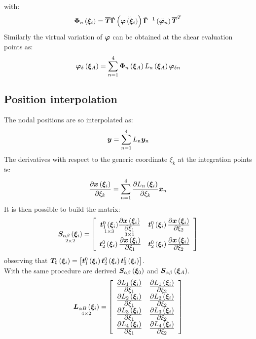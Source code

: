 with:
\begin{equation}
\T{ \Phi }_n \valxii =
\overline{ \TT{T} } \tilde{\TT{\Gamma}} \plbr{ \tilde{ \T{\varphi} \valxii } }  \tilde{\TT{\Gamma}} ^ {-1} \plbr{ \tilde{ \T{\varphi} }_n } \overline{ \TT{T} } ^ T
\end{equation}
Similarly the virtual variation of $\T{\varphi}$ can be obtained at the shear evaluation points as:
\begin{equation}
\T{ \varphi }_{\delta} \valxiA =
\sum_{ n = 1 }^{ 4 } \T{ \Phi }_n \valxiA L_n \valxiA \T{\varphi}_{\delta n}
\end{equation}
\subsection{Position interpolation}
The nodal positions are so interpolated as:
\begin{equation}
\T{ y }   = \sum_{ n = 1 }^4  L_n   \T{ y }_n
\end{equation}
The derivatives with respect to the generic coordinate $\xi_k$ at the integration points is:
\begin{equation}
\fracdp{ \T{ x } \valxii }{ \xi_k }  = \sum_{ n = 1 }^4 \fracdp{ L_n \valxii }{ \xi_k } \T{ x }_n
\end{equation}
It is then possible to build the matrix:
\begin{equation}
\underset{ 2 \times 2 }{ \TT{S}_{ \alpha \beta } \valxii } =
\sqbr{ \matr{ c  c  }{
\underset{ 1 \times 3 }{ \T{ t }_{1}^{0} \valxii } \underset{ 3 \times 1 }{ \fracdp{ \T{x} \valxii }{ \xi_1 } } & \T{ t }_{1}^{0} \valxii \fracdp{ \T{x} \valxii }{ \xi_2 } \\
\T{ t }_{2}^{0} \valxii \fracdp{ \T{x} \valxii }{ \xi_1 } & \T{ t }_{2}^{0} \valxii \fracdp{ \T{x} \valxii }{ \xi_2 }
}}
\end{equation}
observing that $\TT{T}_0 \valxii = \sqbr{ \T{t}_{1}^{0} \valxii  \T{t}_{2}^{0} \valxii \T{t}_{3}^{0} \valxii }$.\\
With the same procedure are derived $\TT{S}_{ \alpha \beta } \valxio$ and  $\TT{S}_{ \alpha \beta } \valxiA$.\\
\begin{equation}
\underset{ 4 \times 2 } { \TT{L}_{ \alpha B } \valxii } =
\sqbr{ \matr{ c c }{
\fracdp{ L_1 \valxii }{ \xi_1 } & \fracdp{ L_1 \valxii }{ \xi_2 } \\
\fracdp{ L_2 \valxii }{ \xi_1 } & \fracdp{ L_2 \valxii }{ \xi_2 } \\
\fracdp{ L_3 \valxii }{ \xi_1 } & \fracdp{ L_3 \valxii }{ \xi_2 } \\
\fracdp{ L_4 \valxii }{ \xi_1 } & \fracdp{ L_4 \valxii }{ \xi_2 } \\
}}
\end{equation}
